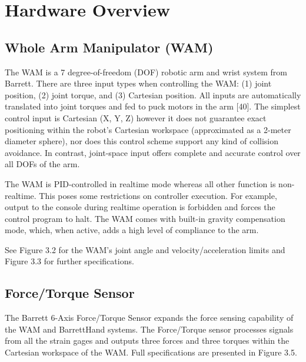 \chapter{Hardware Overview}



\section{Whole Arm Manipulator (WAM)} 

The WAM is a 7 degree-of-freedom (DOF) robotic arm and wrist system from Barrett.
There are three input types when controlling the WAM: (1) joint position, (2) joint torque, and (3) Cartesian position.
All inputs are automatically translated into joint torques and fed to puck motors in the arm [40].
The simplest control input is Cartesian (X, Y, Z) however it does not guarantee exact positioning within the robot’s Cartesian workspace (approximated as a 2-meter diameter sphere), nor does this control scheme support any kind of collision avoidance.
In contrast, joint-space input offers complete and accurate control over all DOFs of the arm.

The WAM is PID-controlled in realtime mode whereas all other function is non-realtime.
This poses some restrictions on controller execution.
For example, output to the console during realtime operation is forbidden and forces the control program to halt.
The WAM comes with built-in gravity compensation mode, which, when active, adds a high level of compliance to the arm.

See Figure 3.2 for the WAM’s joint angle and velocity/acceleration limits and Figure 3.3 for further specifications.

\section{Force/Torque Sensor} 

The Barrett 6-Axis Force/Torque Sensor expands the force sensing capability of the WAM and BarrettHand systems.
The Force/Torque sensor processes signals from all the strain gages and outputs three forces and three torques within the Cartesian workspace of the WAM.
Full specifications are presented in Figure 3.5.

